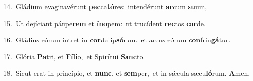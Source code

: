 {\numbfont\textcolor{\numbcolor}{14.}}~Gládium evaginavérunt \textbf{pec}\-ca\-\textbf{tó}\-res:~\star intendérunt \textbf{ar}\-cum \textbf{su}\-um,\par
{\numbfont\textcolor{\numbcolor}{15.}}~Ut dejíciant páupe\textbf{rem} et \textbf{ín}\-\textbf{o}pem:~\star ut trucídent \textbf{rec}\-tos \textbf{cor}\-de.\par
{\numbfont\textcolor{\numbcolor}{16.}}~Gládius eórum intret in \textbf{cor}\-da ip\-\textbf{só}\-rum:~\star et arcus eórum \textbf{con}\-frin\-\textbf{gá}\-tur.\par
{\numbfont\textcolor{\numbcolor}{17.}}~Glória \textbf{Pa}\-tri, et \textbf{Fí}\-\textbf{li}o,~\star et Spi\-\textbf{rí}\-tui \textbf{Sanc}\-to.\par
{\numbfont\textcolor{\numbcolor}{18.}}~Sicut erat in princípio, et \textbf{nunc}\-, et \textbf{sem}\-per,~\star et in sǽcula sæcu\-\textbf{ló}\-rum. \textbf{A}\-men.\par
